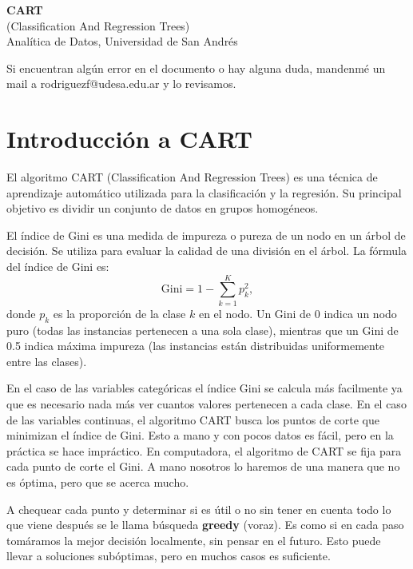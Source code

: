 \documentclass[12pt]{article}
\begin{document}
\begin{center}
  {\LARGE \textbf{CART}}\\[0.5em]
  {\normalsize (Classification And Regression Trees)}\\[0.5em]
  {Analítica de Datos, Universidad de San Andrés}
\end{center}

Si encuentran algún error en el documento o hay alguna duda, mandenmé un mail a rodriguezf@udesa.edu.ar y lo revisamos.

\section{Introducción a CART}
El algoritmo CART (Classification And Regression Trees) es una técnica de aprendizaje automático utilizada para la clasificación y la regresión. Su principal objetivo es dividir un conjunto de datos en grupos homogéneos.

\vspace{1em}

El índice de Gini es una medida de impureza o pureza de un nodo en un árbol de decisión. Se utiliza para evaluar la calidad de una división en el árbol. La fórmula del índice de Gini es:
\[
  \mathrm{Gini} = 1 - \sum_{k=1}^K p_k^2,
\]
donde \(p_k\) es la proporción de la clase \(k\) en el nodo. Un Gini de 0 indica un nodo puro (todas las instancias pertenecen a una sola clase), mientras que un Gini de 0.5 indica máxima impureza (las instancias están distribuidas uniformemente entre las clases).

\vspace{1em}

En el caso de las variables categóricas el índice Gini se calcula más facilmente ya que es necesario nada más ver cuantos valores pertenecen a cada clase. En el caso de las variables continuas, el algoritmo CART busca los puntos de corte que minimizan el índice de Gini. Esto a mano y con pocos datos es fácil, pero en la práctica se hace impráctico. En computadora, el algoritmo de CART se fija para cada punto de corte el Gini. A mano nosotros lo haremos de una manera que no es óptima, pero que se acerca mucho. 

\vspace{1em}

A chequear cada punto y determinar si es útil o no sin tener en cuenta todo lo que viene después se le llama búsqueda \textbf{greedy} (voraz). Es como si en cada paso tomáramos la mejor decisión localmente, sin pensar en el futuro. Esto puede llevar a soluciones subóptimas, pero en muchos casos es suficiente.
\end{document}

